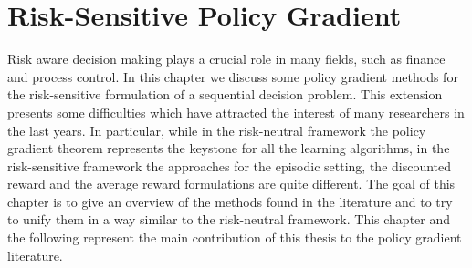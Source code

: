 \chapter{Risk-Sensitive Policy Gradient}
\label{ch:risk_sensitive_policy_gradient}

Risk aware decision making plays a crucial role in many fields, such as finance and process control. In this chapter we discuss some policy gradient methods for the risk-sensitive formulation of a sequential decision problem. This extension presents some difficulties which have attracted the interest of many researchers in the last years. In particular, while in the risk-neutral framework the policy gradient theorem represents the keystone for all the learning algorithms, in the risk-sensitive framework the approaches for the episodic setting, the discounted reward and the average reward formulations are quite different. The goal of this chapter is to give an overview of the methods found in the literature and to try to unify them in a way similar to the risk-neutral framework. This chapter and the following represent the main contribution of this thesis to the policy gradient literature.    

